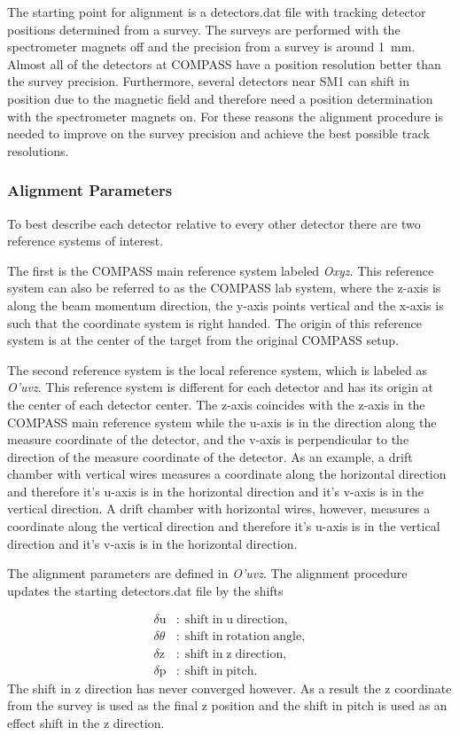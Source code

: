 The starting point for alignment is a detectors.dat file with tracking detector
positions determined from a survey.  The surveys are performed with the
spectrometer magnets off and the precision from a survey is around 1~mm.  Almost
all of the detectors at COMPASS have a position resolution better than the
survey precision.  Furthermore, several detectors near SM1 can shift in position
due to the magnetic field and therefore need a position determination with the
spectrometer magnets on.  For these reasons the alignment procedure is needed to
improve on the survey precision and achieve the best possible track resolutions.

\subsubsection{Alignment Parameters}

To best describe each detector relative to every other detector there are two
reference systems of interest.

The first is the COMPASS main reference system labeled \textit{Oxyz}.  This
reference system can also be referred to as the COMPASS lab system, where the
z-axis is along the beam momentum direction, the y-axis points vertical and the
x-axis is such that the coordinate system is right handed.  The origin of this
reference system is at the center of the target from the original COMPASS setup.

The second reference system is the local reference system, which is labeled as
\textit{O'uvz}.  This reference system is different for each detector and has
its origin at the center of each detector center.  The z-axis coincides with the
z-axis in the COMPASS main reference system while the u-axis is in the direction
along the measure coordinate of the detector, and the v-axis is perpendicular to
the direction of the measure coordinate of the detector.  As an example, a drift
chamber with vertical wires measures a coordinate along the horizontal direction
and therefore it's u-axis is in the horizontal direction and it's v-axis is in
the vertical direction.  A drift chamber with horizontal wires, however,
measures a coordinate along the vertical direction and therefore it's u-axis is
in the vertical direction and it's v-axis is in the horizontal direction.

The alignment parameters are defined in \textit{O'uvz}.  The alignment procedure
updates the starting detectors.dat file by the shifts

\begin{align}
  \delta \mathrm{u} & \mathrm{: \; shift \; in \; u \; direction,}  \\
  \delta \theta & \mathrm{: \; shift \; in \; rotation \; angle,}  \\
  \delta \mathrm{z} & \mathrm{: \; shift \; in \; z \; direction,}  \\
  \delta \mathrm{p} & \mathrm{: \; shift \; in \; pitch.} 
\end{align}
\noindent
The shift in z direction has never converged however.  As a result the z
coordinate from the survey is used as the final z position and the shift in
pitch is used as an effect shift in the z direction.

